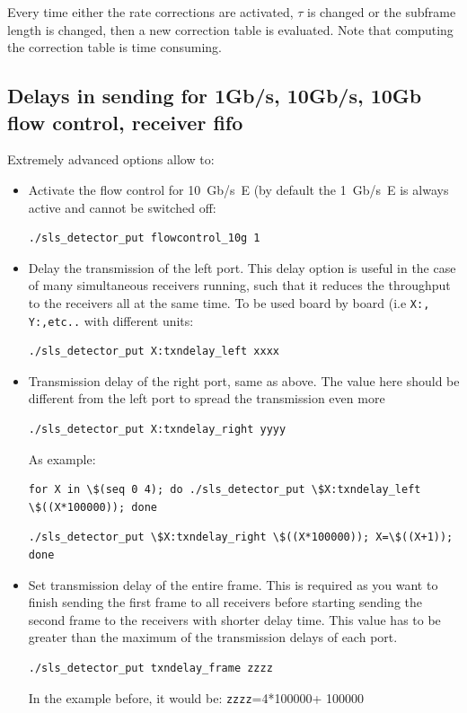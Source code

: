 \documentclass{article}
\begin{document}
Every time either the rate corrections are activated, $\tau$ is changed or the subframe length is changed, then a new correction table is evaluated. Note that computing the correction table is time consuming. 

\subsection{Delays in sending for 1Gb/s, 10Gb/s, 10Gb flow control, receiver fifo}

Extremely advanced options allow to:
\begin{itemize}
\item Activate the flow control for 10~Gb/s~E (by default the 1~Gb/s~E is always active and cannot be switched off:
\begin{verbatim}
./sls_detector_put flowcontrol_10g 1
\end{verbatim}
\item  Delay the transmission of the left port. This delay option is useful in the case of many simultaneous receivers running, such that it reduces the throughput to the receivers all at the same time. To be used board by board (i.e {\tt{X:, Y:,etc..}} with different units:
\begin{verbatim}
./sls_detector_put X:txndelay_left xxxx 
\end{verbatim}
\item  Transmission delay of the right port, same as above. The value here should be different from the left port to spread the transmission even more 
\begin{verbatim}
./sls_detector_put X:txndelay_right yyyy
\end{verbatim}
As example:
\begin{verbatim}
for X in \$(seq 0 4); do ./sls_detector_put \$X:txndelay_left \$((X*100000)); done
 \end{verbatim}
\begin{verbatim}
./sls_detector_put \$X:txndelay_right \$((X*100000)); X=\$((X+1)); done
\end{verbatim}

\item Set transmission delay of the entire frame. This is required as you want to finish sending the first frame to all receivers before starting sending the second frame to the receivers with shorter delay time.  This value has to be greater than the maximum of the transmission delays of each port.      
\begin{verbatim}
./sls_detector_put txndelay_frame zzzz
\end{verbatim}
In the example before, it would be: {\tt{zzzz}}=4*100000+ 100000


\end{itemize}
\end{document}
